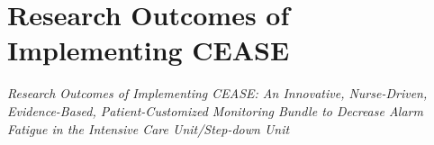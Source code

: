 \section{Research Outcomes of Implementing CEASE}

\textit{Research Outcomes of Implementing CEASE: An Innovative, Nurse-Driven, Evidence-Based, Patient-Customized Monitoring Bundle to Decrease Alarm Fatigue in the Intensive Care Unit/Step-down Unit}

\cite{lewis2019research}
